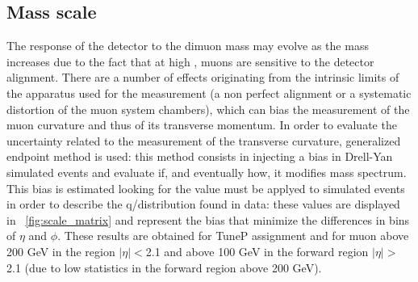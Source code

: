 \subsection{Mass scale} 
\label{sec:massScale}
The response of the detector to the dimuon mass may evolve as the mass increases due to the fact that at high \pt, muons are sensitive to the detector alignment. There are a number of effects originating from the intrinsic limits of the apparatus used for the measurement (a non perfect alignment or a systematic distortion of the muon system chambers), which can bias the measurement of the muon curvature and thus of its transverse momentum. In order to evaluate the uncertainty related to the measurement of the transverse curvature, generalized endpoint method is used: this method consists in injecting a bias in Drell-Yan simulated events and evaluate if, and eventually how, it modifies mass spectrum.
This bias is estimated looking for the value must be applyed to simulated events in order to describe the q/\pt distribution found in data: these values are displayed in \figurename~\ref{fig:scale_matrix} and represent the bias that minimize the differences in bins of $\eta$ and $\phi$. These results are obtained for TuneP \pt assignment and for muon above 200 GeV in the region $|\eta|<$2.1 and above 100 GeV in the forward region $|\eta|>$2.1 (due to low statistics in the forward region above 200 GeV). 


